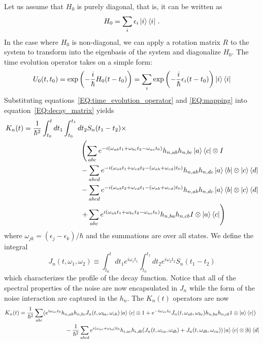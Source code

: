 Let us assume that $H_0$ is purely diagonal, that is, it can be written as
\begin{equation}
    H_0 = \sum_i \epsilon_i\ket{i}\bra{i} \,.
\end{equation}
In the case where $H_0$ is non-diagonal, we can apply a rotation matrix $R$ to the system to transform into the eigenbasis of the system and diagonalize $H_0$.
The time evolution operator takes on a simple form:
\begin{equation}\label{EQ:time_evolution_operator}
    U_0(t,t_0)  = \exp\left(-\frac{i}{\hbar}H_0(t-t_0)\right) = \sum_i \exp\left(-\frac{i}{\hbar}\epsilon_i (t-t_0)\right)\ket{i}\bra{i}
\end{equation}
Substituting equations~\ref{EQ:time_evolution_operator} and \ref{EQ:mapping} into equation~\ref{EQ:decay_matrix} yields
\begin{align}
    K_n(t) & =\frac{1}{\hbar^2}\int_{t_0}^tdt_1\int_{t_0}^{t_1}dt_2 S_n(t_1-t_2)\times \nonumber                                                                                    \\
           & \qquad\qquad\qquad\qquad \left(\sum_{abc}e^{-i(\omega_{ab}t_1+\omega_{bc}t_2-\omega_{ac}t_0)}h_{n,ab}h_{n,bc}\ket{a}\bra{c}\otimes I\right. \nonumber                  \\
           & \qquad\qquad\qquad\qquad -\sum_{abcd}e^{-i(\omega_{ab}t_1+\omega_{cd}t_2-(\omega_{ab}+\omega_{cd})t_0)}h_{n,ab}h_{n,dc} \ket{a}\bra{b}\otimes \ket{c}\bra{d}\nonumber  \\
           & \qquad\qquad\qquad\qquad -\sum_{abcd}e^{-i(\omega_{ab}t_2+\omega_{cd}t_1-(\omega_{ab}+\omega_{cd})t_0)}h_{n,ab}h_{n,dc} \ket{a}\bra{b}\otimes \ket{c}\bra{d} \nonumber \\
           & \qquad\qquad\qquad\qquad \left.+ \sum_{abc}e^{i(\omega_{ab}t_1+\omega_{bc}t_2-\omega_{ac}t_0)}h_{n,ba}h_{n,cb} I\otimes \ket{a}\bra{c}\right)
\end{align}
where $\omega_{jk} = (\epsilon_j - \epsilon_k)/\hbar$ and the summations are over all states. We define the integral
\begin{equation}
    J_n(t,\omega_1,\omega_2)\equiv \int_{t_0}^tdt_1e^{i\omega_1t_1}\int_{t_0}^{t_1}dt_2 e^{i\omega_2t_2} S_n(t_1-t_2)
\end{equation}
which characterizes the profile of the decay function. Notice that all of the spectral properties of the noise are now encapsulated in $J_n$ while the form of the noise interaction are captured in the $h_{n}$. The $K_n(t)$ operators are now
\begin{align}
    K_n(t) & =\frac{1}{\hbar^2}\sum_{abc}(e^{i\omega_{ac}t_0}h_{n,ab}h_{n,bc}J_n(t,\omega_{ba},\omega_{cb})\ket{a}\bra{c}\otimes 1+e^{-i\omega_{ac}t_0}J_n(t,\omega_{ab},\omega_{bc})h_{n,ba}h_{n,cb} 1\otimes \ket{a}\bra{c}) \nonumber \\
           & \qquad\qquad\qquad\qquad -\frac{1}{\hbar^2}\sum_{abcd}e^{i(\omega_{ac}+\omega_{bd})t_0}h_{i,ac}h_{i,db} (J_n(t,\omega_{ca},\omega_{db})+J_n(t,\omega_{db},\omega_{ca})) \ket{a}\bra{c}\otimes \ket{b}\bra{d}
\end{align}
